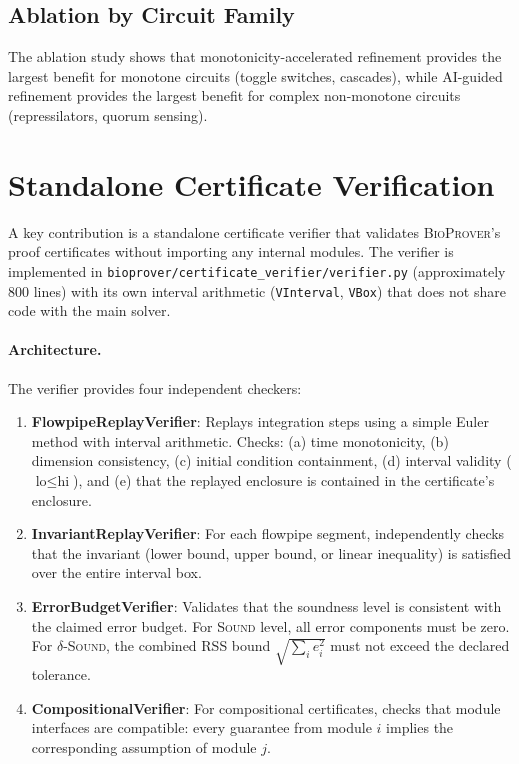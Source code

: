 \documentclass[11pt]{article}
\newcommand{\bioprover}{\textsc{BioProver}}
\begin{document}
\subsection{Ablation by Circuit Family}

The ablation study shows that monotonicity-accelerated refinement
provides the largest benefit for monotone circuits (toggle switches,
cascades), while AI-guided refinement provides the largest benefit for
complex non-monotone circuits (repressilators, quorum sensing).

\section{Standalone Certificate Verification}
\label{app:certificate}

A key contribution is a standalone certificate verifier that validates
\bioprover{}'s proof certificates without importing any internal modules.
The verifier is implemented in \texttt{bioprover/certificate\_verifier/verifier.py}
(approximately 800 lines) with its own interval arithmetic (\texttt{VInterval},
\texttt{VBox}) that does not share code with the main solver.

\paragraph{Architecture.}
The verifier provides four independent checkers:

\begin{enumerate}
\item \textbf{FlowpipeReplayVerifier}: Replays integration steps using
  a simple Euler method with interval arithmetic. Checks:
  (a) time monotonicity, (b) dimension consistency, (c) initial condition
  containment, (d) interval validity ($\text{lo} \leq \text{hi}$), and
  (e) that the replayed enclosure is contained in the certificate's enclosure.

\item \textbf{InvariantReplayVerifier}: For each flowpipe segment,
  independently checks that the invariant (lower bound, upper bound,
  or linear inequality) is satisfied over the entire interval box.

\item \textbf{ErrorBudgetVerifier}: Validates that the soundness level
  is consistent with the claimed error budget. For \textsc{Sound} level,
  all error components must be zero. For \textsc{$\delta$-Sound}, the
  combined RSS bound $\sqrt{\sum_i e_i^2}$ must not exceed the declared tolerance.

\item \textbf{CompositionalVerifier}: For compositional certificates,
  checks that module interfaces are compatible: every guarantee from
  module $i$ implies the corresponding assumption of module $j$.
\end{enumerate}
\end{document}
